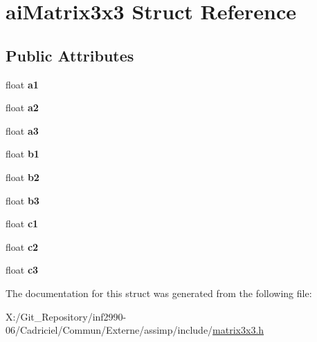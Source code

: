 \hypertarget{structai_matrix3x3}{\section{ai\-Matrix3x3 Struct Reference}
\label{structai_matrix3x3}
}
\subsection*{Public Attributes}
\begin{DoxyCompactItemize}
\item 
\hypertarget{structai_matrix3x3_a6884258a2f50758ed8b554b531186917}{float {\bfseries a1}}\label{structai_matrix3x3_a6884258a2f50758ed8b554b531186917}

\item 
\hypertarget{structai_matrix3x3_a4c74733870193040ba4953fb673e77df}{float {\bfseries a2}}\label{structai_matrix3x3_a4c74733870193040ba4953fb673e77df}

\item 
\hypertarget{structai_matrix3x3_a851d391df32a39e1ced1a9a286b38cf4}{float {\bfseries a3}}\label{structai_matrix3x3_a851d391df32a39e1ced1a9a286b38cf4}

\item 
\hypertarget{structai_matrix3x3_a9eeba340d3502017caad70416f03863a}{float {\bfseries b1}}\label{structai_matrix3x3_a9eeba340d3502017caad70416f03863a}

\item 
\hypertarget{structai_matrix3x3_a9f5e25b60bbd7bdf8f0a19cd82cc6b15}{float {\bfseries b2}}\label{structai_matrix3x3_a9f5e25b60bbd7bdf8f0a19cd82cc6b15}

\item 
\hypertarget{structai_matrix3x3_a21aa4345fe6ce2774db94d118c536d02}{float {\bfseries b3}}\label{structai_matrix3x3_a21aa4345fe6ce2774db94d118c536d02}

\item 
\hypertarget{structai_matrix3x3_ae62a2877076cbee151e89cb34567e3ca}{float {\bfseries c1}}\label{structai_matrix3x3_ae62a2877076cbee151e89cb34567e3ca}

\item 
\hypertarget{structai_matrix3x3_a8e0d85d5c46eb4f4478f1fe159be4320}{float {\bfseries c2}}\label{structai_matrix3x3_a8e0d85d5c46eb4f4478f1fe159be4320}

\item 
\hypertarget{structai_matrix3x3_aa7eef894dec22db1011092410b24f19b}{float {\bfseries c3}}\label{structai_matrix3x3_aa7eef894dec22db1011092410b24f19b}

\end{DoxyCompactItemize}


The documentation for this struct was generated from the following file\-:\begin{DoxyCompactItemize}
\item 
X\-:/\-Git\-\_\-\-Repository/inf2990-\/06/\-Cadriciel/\-Commun/\-Externe/assimp/include/\hyperlink{matrix3x3_8h}{matrix3x3.\-h}\end{DoxyCompactItemize}
